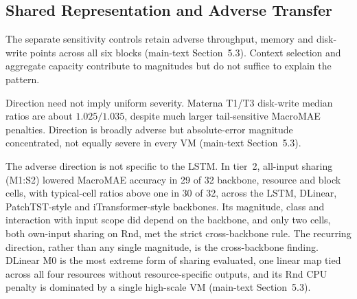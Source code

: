 \documentclass[a4paper,11pt]{article}
\begin{document}
\subsection*{Shared Representation and Adverse Transfer}


The separate sensitivity controls retain adverse throughput, memory and
disk-write points across all six blocks (main-text Section~5.3).
Context selection and aggregate capacity contribute to magnitudes but do not
suffice to explain the pattern.

Direction need not imply uniform severity. Materna T1/T3 disk-write median
ratios are about $1.025/1.035$, despite much larger tail-sensitive MacroMAE penalties.
Direction is broadly adverse but absolute-error magnitude concentrated,
not equally severe in every VM (main-text Section~5.3).

The adverse direction is not specific to the LSTM. In tier~2, all-input
sharing (M1:S2) lowered MacroMAE accuracy in 29 of 32 backbone, resource and
block cells, with typical-cell ratios above one in 30 of 32, across the
LSTM, DLinear, PatchTST-style and iTransformer-style backbones. Its
magnitude, class and interaction with input scope did depend on the
backbone, and only two cells, both own-input sharing on Rnd, met the strict
cross-backbone rule. The recurring direction, rather than any single
magnitude, is the cross-backbone finding. DLinear M0 is the most extreme
form of sharing evaluated, one linear map tied across all four resources
without resource-specific outputs, and its Rnd CPU penalty is dominated by a
single high-scale VM (main-text Section~5.3).
\end{document}
